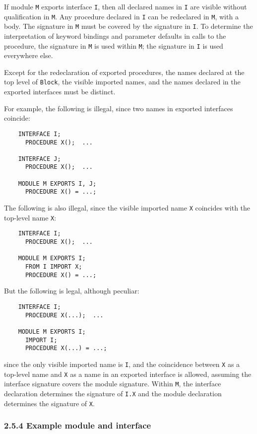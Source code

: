 \documentclass[10pt]{article}
\begin{document}
If module \verb|M| exports interface \verb|I|, then all declared names in
\verb|I| are visible without qualification in \verb|M|.  Any procedure
declared in \verb|I| can be redeclared in \verb|M|, with a body.  The
signature in \verb|M| must be covered by the signature in \verb|I|.  To
determine the interpretation of keyword bindings and parameter defaults in
calls to the procedure, the signature in \verb|M| is used within \verb|M|; the
signature in \verb|I| is used everywhere else.

Except for the redeclaration of exported procedures, the names declared at the
top level of \verb|Block|, the visible imported names, and the names declared
in the exported interfaces must be distinct.

For example, the following is illegal, since two names in exported interfaces
coincide:
\begin{verbatim}
    INTERFACE I;
      PROCEDURE X();  ...

    INTERFACE J;
      PROCEDURE X();  ...

    MODULE M EXPORTS I, J;
      PROCEDURE X() = ...;
\end{verbatim}

The following is also illegal, since the visible imported name \verb|X|
coincides with the top-level name \verb|X|:
\begin{verbatim}
    INTERFACE I;
      PROCEDURE X();  ...

    MODULE M EXPORTS I;
      FROM I IMPORT X;
      PROCEDURE X() = ...;
\end{verbatim}

But the following is legal, although peculiar:
\begin{verbatim}
    INTERFACE I;
      PROCEDURE X(...);  ...

    MODULE M EXPORTS I;
      IMPORT I;
      PROCEDURE X(...) = ...;
\end{verbatim}
since the only visible imported name is \verb|I|, and the coincidence between
\verb|X| as a top-level name and \verb|X| as a name in an exported interface
is allowed, assuming the interface signature covers the module signature.
Within \verb|M|, the interface declaration determines the signature of
\verb|I.X| and the module declaration determines the signature of \verb|X|.

\subsubsection*{2.5.4 Example module and interface}
\end{document}
